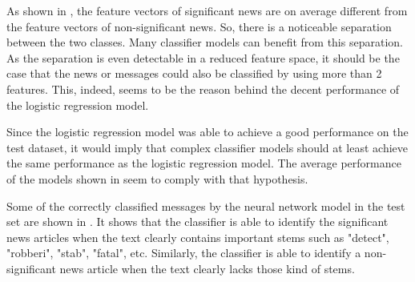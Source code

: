 As shown in , the feature vectors of significant news are on average different from the feature vectors of non-significant news. So, there is a noticeable separation between the two classes. Many classifier models can benefit from this separation. As the separation is even detectable in a reduced feature space, it should be the case that the news or messages could also be classified by using more than 2 features.  This, indeed, seems to be the reason behind the decent performance of the logistic regression model.

Since the logistic regression model was able to achieve a good performance on the test dataset, it would imply that complex classifier models should at least achieve the same performance as the logistic regression model. %
The average performance of the models shown in  seem to comply with that hypothesis.

Some of the correctly classified messages by the neural network model in the test set are shown in . It shows that the classifier is able to identify the significant news articles when the text clearly contains important stems such as "detect", "robberi", "stab", "fatal", etc. Similarly, the classifier is able to identify a non-significant news article when the text clearly lacks those kind of stems.

